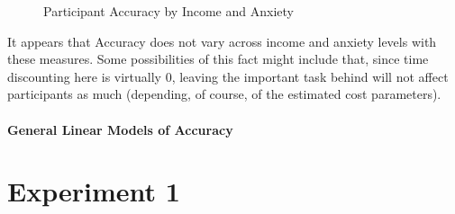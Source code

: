 \documentclass[
]{report}
\begin{document}
\begin{figure}

\begin{minipage}[t]{0.50\linewidth}

{\centering 


}

\end{minipage}%
%
\begin{minipage}[t]{0.50\linewidth}

{\centering 


}

\end{minipage}%

\caption{\label{fig-accuracy-results}Participant Accuracy by Income and
Anxiety}

\end{figure}

It appears that Accuracy does not vary across income and anxiety levels
with these measures. Some possibilities of this fact might include that,
since time discounting here is virtually 0, leaving the important task
behind will not affect participants as much (depending, of course, of
the estimated cost parameters).

\hypertarget{general-linear-models-of-accuracy}{%
\subsubsection{General Linear Models of
Accuracy}\label{general-linear-models-of-accuracy}}

\begin{table}

\end{table}

\hypertarget{experiment-1}{%
\chapter{Experiment 1}\label{experiment-1}}
\end{document}
